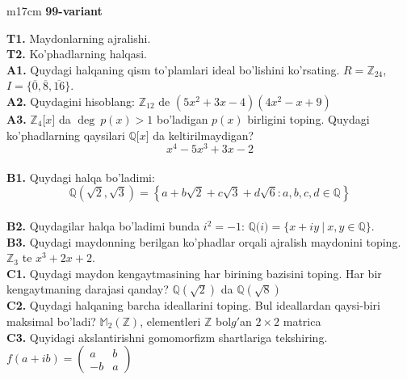 \documentclass{article}
\begin{document}
\begin{tabular}{m{17cm}}
\textbf{99-variant}
\newline

\textbf{T1.} Maydonlarning ajralishi. \\
\textbf{T2.} Ko'phadlarning halqasi. \\
\textbf{A1.} Quydagi halqaning qism to'plamlari ideal bo'lishini ko'rsating.
\(R = \mathbb{Z}_{24}\), \(I = \{\overline{0},\overline{8},\overline{16}\}\). \\
\textbf{A2.} Quydagini hisoblang:
\(\mathbb{Z}_{12}\) de \(\left( 5x^{2} + 3x - 4 \right)\left( 4x^{2} - x + 9 \right)\) \\
\textbf{A3.} \(\mathbb{Z}_{4}\lbrack x\rbrack\) da \(\deg\ p(x) > 1\) bo'ladigan \(p(x)\) birligini toping. Quydagi ko'phadlarning qaysilari \(\mathbb{Q\lbrack}x\rbrack\) da keltirilmaydigan?
\[x^{4} - 5x^{3} + 3x - 2\] \\
\textbf{B1.} Quydagi halqa bo'ladimi:
\[\mathbb{Q}\left( \sqrt{2},\sqrt{3} \right) = \left\{ a + b\sqrt{2} + c\sqrt{3} + d\sqrt{6}:a,b,c,d \in \mathbb{Q} \right\}\] \\
\textbf{B2.} Quydagilar halqa bo'ladimi bunda \(i^{2} = - 1\):
\(\mathbb{Q(}i) = \{ x + iy\ |\ x,y \in \mathbb{Q\}}\). \\
\textbf{B3.} Quydagi maydonning berilgan ko'phadlar orqali ajralish maydonini toping.
\(\mathbb{Z}_{3}\) te \(x^{3} + 2x + 2\). \\
\textbf{C1.} Quydagi maydon kengaytmasining har birining bazisini toping. Har bir kengaytmaning darajasi qanday?
\(\mathbb{Q}\left( \sqrt{2} \right)\) da \(\mathbb{Q}\left( \sqrt{8} \right)\) \\
\textbf{C2.} Quydagi halqaning barcha ideallarini toping. Bul ideallardan qaysi-biri maksimal bo'ladi?
\(\mathbb{M}_{2}\left( \mathbb{Z} \right)\), elementleri \(\mathbb{Z}\) bol\(g'\)an \(2 \times 2\) matrica \\
\textbf{C3.} Quyidagi akslantirishni gomomorfizm shartlariga tekshiring. \(f(a + ib) = \begin{pmatrix}
a & b \\
 - b & a
\end{pmatrix}\) \\

\end{tabular}
\vspace{1cm}
\end{document}
